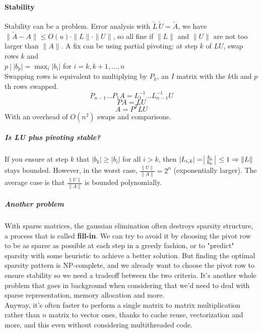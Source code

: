 \documentclass[10pt]{report}
\begin{document}
\paragraph{Stability} Stability can be a problem. Error analysis with $\tilde{L}\,\tilde{U} = \tilde{A}$, we have $\|\tilde{A}-A\|\leq O(u)\cdot\|L\|\cdot\|U\|$, so all fine if $\|L\|$ and $\|U\|$ are not too larger than $\|A\|$. A fix can be using partial pivoting: at step $k$ of $LU$, swap rows $k$ and\\$p\:|\:|b_p|=\max_i|b_i|$ for $i=k,k+1,\ldots,n$\\
Swapping rows is equivalent to multiplying by $P_k$, an $I$ matrix with the $k$th and $p$th rows swapped.
$$P_{n-1}\ldots P_1A=L_1^{-1}\ldots L_{n-1}^{-1}U$$
$$PA = LU$$
$$A = P^TLU$$
With an overhead of $O(n^2)$ swaps and comparisons.
\subparagraph{Is LU plus pivoting stable?} If you ensure at step $k$ that $|b_k|\geq |b_i|$ for all $i>k$, then $|L_{i,k}| = \:\vline\frac{b_i}{b_k}\:\vline\:\leq 1 \Rightarrow \|L\|$ stays bounded. However, in the worst case, $\frac{\|U\|}{\|A\|} = 2^n$ (exponentially larger). The average case is that $\frac{\|U\|}{\|A\|}$ is bounded polynomially.
\subparagraph{Another problem} With sparse matrices, the gaussian elimination often destroys sparsity structure, a process that is called \textbf{fill-in}. We can try to avoid it by choosing the pivot row to be as sparse as possible at each step in a greedy fashion, or to "predict" sparsity with some heuristic to achieve a better solution. But finding the optimal sparsity pattern is NP-complete, and we already want to choose the pivot row to ensure stability so we need a tradeoff between the two criteria. It's another whole problem that goes in background when considering that we'd need to deal with sparse representation, memory allocation and more.\\
Anyway, it's often faster to perform a single matrix to matrix multiplication rather than $n$ matrix to vector ones, thanks to cache reuse, vectorization and more, and this even without considering multithreaded code.
\end{document}
